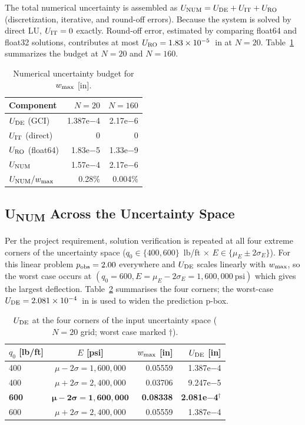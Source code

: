\documentclass[10pt,twocolumn]{article}
\begin{document}
The total numerical uncertainty is assembled as
$U_{\rm NUM} = U_{\rm DE} + U_{\rm IT} + U_{\rm RO}$
(discretization, iterative, and round-off errors).
Because the system is solved by direct LU, $U_{\rm IT}=0$ exactly.
Round-off error, estimated by comparing float64 and float32 solutions,
contributes at most $U_{\rm RO}=1.83\times10^{-5}$~in at $N=20$.
Table~\ref{tab:unum} summarizes the budget at $N=20$ and $N=160$.

\begin{table}[ht]
\centering
\caption{Numerical uncertainty budget for $w_{\rm max}$ [in].}
\label{tab:unum}
\small
\begin{tabular}{@{}lrr@{}}
\toprule
Component & $N=20$ & $N=160$\\
\midrule
$U_{\rm DE}$ (GCI) & 1.387e$-$4 & 2.17e$-$6\\
$U_{\rm IT}$ (direct) & 0 & 0\\
$U_{\rm RO}$ (float64) & 1.83e$-$5 & 1.33e$-$9\\
\midrule
$U_{\rm NUM}$ & 1.57e$-$4 & 2.17e$-$6\\
$U_{\rm NUM}/w_{\rm max}$ & 0.28\% & 0.004\%\\
\bottomrule
\end{tabular}
\end{table}

\subsection{U\textsubscript{NUM} Across the Uncertainty Space}
\label{sec:unum_corners}

Per the project requirement, solution verification is repeated at all four
extreme corners of the uncertainty space
($q_0\in\{400,600\}$~lb/ft $\times$ $E\in\{\mu_E\pm2\sigma_E\}$).
For this linear problem $p_{\rm obs}=2.00$ everywhere and $U_{\rm DE}$
scales linearly with $w_{\rm max}$, so the worst case occurs at
$(q_0=600, E=\mu_E-2\sigma_E=1{,}600{,}000~\text{psi})$ which gives
the largest deflection.
Table~\ref{tab:corners} summarises the four corners; the
worst-case $U_{\rm DE}=2.081\times10^{-4}$~in is used to widen the
prediction p-box.

\begin{table}[ht]
\centering
\caption{$U_{\rm DE}$ at the four corners of the input uncertainty space
  ($N=20$ grid; worst case marked $\dagger$).}
\label{tab:corners}
\footnotesize
\setlength{\tabcolsep}{4pt}
\begin{tabular}{@{}lcrr@{}}
\toprule
$q_0$ [lb/ft] & $E$ [psi] & $w_{\rm max}$ [in] & $U_{\rm DE}$ [in]\\
\midrule
400 & $\mu-2\sigma=1{,}600{,}000$ & 0.05559 & 1.387e$-$4\\
400 & $\mu+2\sigma=2{,}400{,}000$ & 0.03706 & 9.247e$-$5\\
\textbf{600} & $\boldsymbol{\mu-2\sigma=1{,}600{,}000}$ & \textbf{0.08338} & \textbf{2.081e$-$4}$^\dagger$\\
600 & $\mu+2\sigma=2{,}400{,}000$ & 0.05559 & 1.387e$-$4\\
\bottomrule
\end{tabular}
\end{table}
\end{document}
